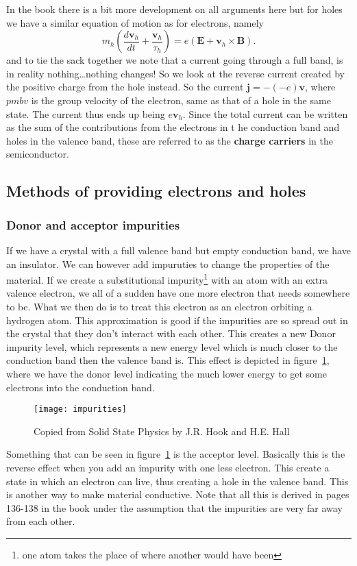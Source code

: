 \documentclass[11pt]{article}
\begin{document}
In the book there is a bit more development on all arguments here but for holes we have a similar equation of motion as for electrons, namely
\begin{equation}
	m_h(\frac{d\pmb{v}_h}{dt} + \frac{\pmb{v}_h}{\tau_h}) = e(\pmb{E} + \pmb{v}_h \times \pmb{B}).
\end{equation}
and to tie the sack together we note that a current going through a full band, is in reality nothing\ldots nothing changes! So we look at the reverse current created by the positive charge from the hole instead. So the current $\pmb{j} = - (-e) \pmb{v}$, where $pmb{v}$ is the group velocity of the electron, same as that of a hole in the same state. The current thus ends up being $e\pmb{v}_h$. Since the total current can be written as the sum of the contributions from the electrons in t he conduction band and holes in the valence band, these are referred to as the \textbf{charge carriers} in the semiconductor.
\subsection{Methods of providing electrons and holes}

\subsubsection{Donor and acceptor impurities}
If we have a crystal with a full valence band but empty conduction band, we have an insulator. We can however add impuruties to change the properties of the material. If we create a substitutional impurity\footnote{one atom takes the place of where another would have been} with an atom with an extra valence electron, we all of a sudden have one more electron that needs somewhere to be. What we then do is to treat this electron as an electron orbiting a hydrogen atom. This approximation is good if the impurities are so spread out in the crystal that they don't interact with each other. This creates a new Donor impurity level, which represents a new energy level which is much closer to the conduction band then the valence band is. This effect is depicted in figure~\ref{fig:impurities}, where we have the donor level indicating the much lower energy to get some electrons into the conduction band.
\begin{figure}[!ht]
	\centering
	\texttt{[image: impurities]}
	\caption{Copied from Solid State Physics by J.R. Hook and H.E. Hall}
	\label{fig:impurities}
\end{figure}
Something that can be seen in figure~\ref{fig:impurities} is the acceptor level. Basically this is the reverse effect when you add an impurity with one less electron. This create a state in which an electron can live, thus creating a hole in the valence band. This is another way to make material conductive. Note that all this is derived in pages 136-138 in the book under the assumption that the impurities are very far away from each other.
\newpage
\end{document}
